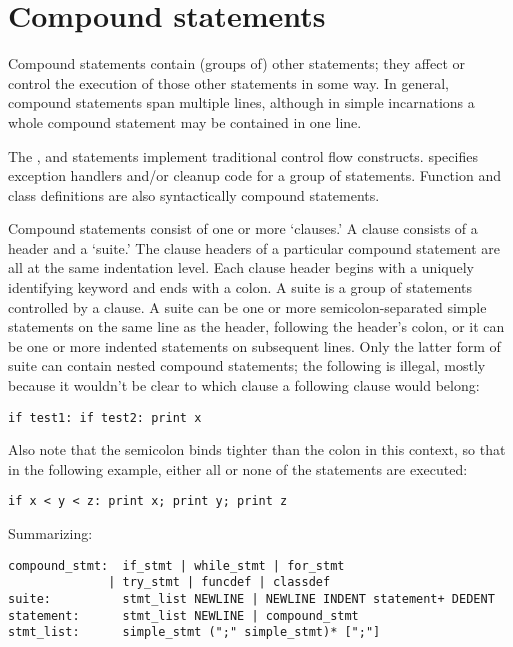 \chapter{Compound statements}

Compound statements contain (groups of) other statements; they affect
or control the execution of those other statements in some way.  In
general, compound statements span multiple lines, although in simple
incarnations a whole compound statement may be contained in one line.

The ,  and  statements implement
traditional control flow constructs.   specifies exception
handlers and/or cleanup code for a group of statements.  Function and
class definitions are also syntactically compound statements.

Compound statements consist of one or more `clauses.'  A clause
consists of a header and a `suite.'  The clause headers of a
particular compound statement are all at the same indentation level.
Each clause header begins with a uniquely identifying keyword and ends
with a colon.  A suite is a group of statements controlled by a
clause.  A suite can be one or more semicolon-separated simple
statements on the same line as the header, following the header's
colon, or it can be one or more indented statements on subsequent
lines.  Only the latter form of suite can contain nested compound
statements; the following is illegal, mostly because it wouldn't be
clear to which  clause a following  clause would
belong:

\begin{verbatim}
if test1: if test2: print x
\end{verbatim}

Also note that the semicolon binds tighter than the colon in this
context, so that in the following example, either all or none of the
 statements are executed:

\begin{verbatim}
if x < y < z: print x; print y; print z
\end{verbatim}

Summarizing:

\begin{verbatim}
compound_stmt:  if_stmt | while_stmt | for_stmt
              | try_stmt | funcdef | classdef
suite:          stmt_list NEWLINE | NEWLINE INDENT statement+ DEDENT
statement:      stmt_list NEWLINE | compound_stmt
stmt_list:      simple_stmt (";" simple_stmt)* [";"]
\end{verbatim}


